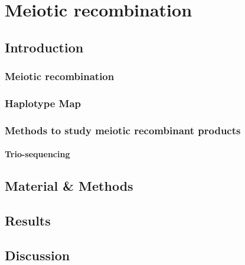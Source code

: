 \chapter{Meiotic recombination}

\ifpdf
    \graphicspath{{Chapter4/Figs/Raster/}{Chapter4/Figs/PDF/}{Chapter4/Figs/}}
\else
    \graphicspath{{Chapter4/Figs/Vector/}{Chapter4/Figs/}}
\fi





\section{Introduction}


\subsection{Meiotic recombination}
\subsection{Haplotype Map}
\subsection{Methods to study meiotic recombinant products}
\subsubsection{Trio-sequencing}
\section{Material \& Methods}
\section{Results}
\section{Discussion}
